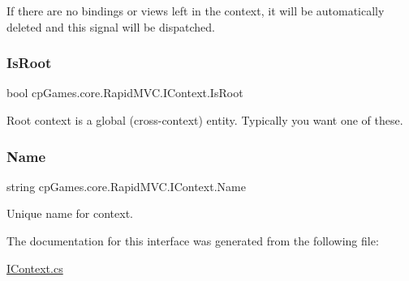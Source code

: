 If there are no bindings or views left in the context, it will be automatically deleted and this signal will be dispatched. 

\mbox{\label{interfacecp_games_1_1core_1_1_rapid_m_v_c_1_1_i_context_ac7e05700419090786a56b92d64a35728}} 
\subsubsection{\texorpdfstring{IsRoot}{IsRoot}}
{\footnotesize\ttfamily bool cp\+Games.\+core.\+Rapid\+M\+V\+C.\+I\+Context.\+Is\+Root\hspace{0.3cm}{\ttfamily [get]}}



Root context is a global (cross-\/context) entity. Typically you want one of these. 

\mbox{\label{interfacecp_games_1_1core_1_1_rapid_m_v_c_1_1_i_context_a75d949e147b0c638729e455a99d361bc}} 
\subsubsection{\texorpdfstring{Name}{Name}}
{\footnotesize\ttfamily string cp\+Games.\+core.\+Rapid\+M\+V\+C.\+I\+Context.\+Name\hspace{0.3cm}{\ttfamily [get]}}



Unique name for context. 



The documentation for this interface was generated from the following file\+:\begin{DoxyCompactItemize}
\item 
\mbox{\hyperlink{_i_context_8cs}{I\+Context.\+cs}}\end{DoxyCompactItemize}
